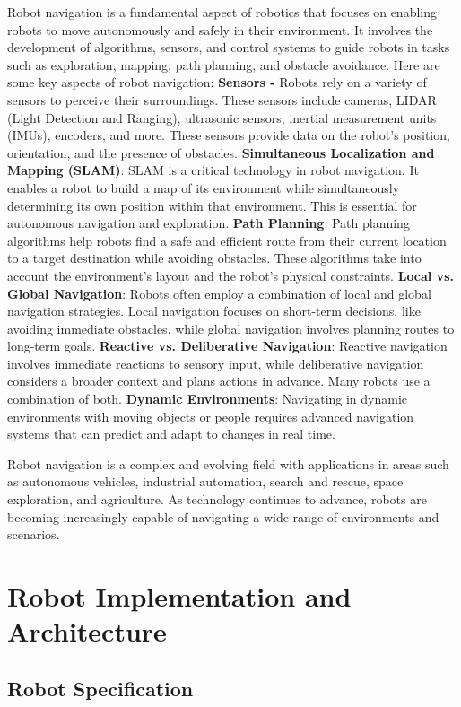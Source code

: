 \documentclass[conference]{IEEEtran}
\begin{document}
Robot navigation is a fundamental aspect of robotics that focuses on enabling robots to move autonomously and safely in their environment. It involves the development of algorithms, sensors, and control systems to guide robots in tasks such as exploration, mapping, path planning, and obstacle avoidance. Here are some key aspects of robot navigation: \textbf{Sensors -} Robots rely on a variety of sensors to perceive their surroundings. These sensors include cameras, LIDAR (Light Detection and Ranging), ultrasonic sensors, inertial measurement units (IMUs), encoders, and more. These sensors provide data on the robot's position, orientation, and the presence of obstacles. \textbf{Simultaneous Localization and Mapping (SLAM)}: SLAM is a critical technology in robot navigation. It enables a robot to build a map of its environment while simultaneously determining its own position within that environment. This is essential for autonomous navigation and exploration.\textbf{ Path Planning}: Path planning algorithms help robots find a safe and efficient route from their current location to a target destination while avoiding obstacles. These algorithms take into account the environment's layout and the robot's physical constraints. \textbf{Local vs. Global Navigation}: Robots often employ a combination of local and global navigation strategies. Local navigation focuses on short-term decisions, like avoiding immediate obstacles, while global navigation involves planning routes to long-term goals. \textbf{Reactive vs. Deliberative Navigation}: Reactive navigation involves immediate reactions to sensory input, while deliberative navigation considers a broader context and plans actions in advance. Many robots use a combination of both. \textbf{Dynamic Environments}: Navigating in dynamic environments with moving objects or people requires advanced navigation systems that can predict and adapt to changes in real time. \par
Robot navigation is a complex and evolving field with applications in areas such as autonomous vehicles, industrial automation, search and rescue, space exploration, and agriculture. As technology continues to advance, robots are becoming increasingly capable of navigating a wide range of environments and scenarios.


\section{Robot Implementation and Architecture}

\subsection{Robot Specification}
\end{document}

